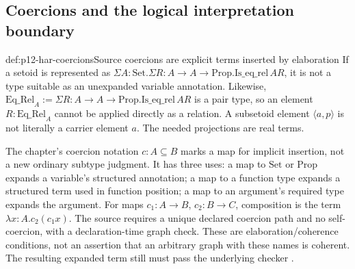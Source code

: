 

\subsection{Coercions and the logical interpretation boundary}

\begin{hbdefinition}{def:p12-har-coercions}{Source coercions are explicit terms inserted by elaboration}
If a setoid is represented as
\(\Sigma A:\mathrm{Set}.\Sigma R:A\to A\to\mathrm{Prop}.
\mathrm{Is\_eq\_rel}\,A R\), it is not a type suitable as an
unexpanded variable annotation. Likewise,
\(\mathrm{Eq\_Rel}_A:=\Sigma R:A\to A\to\mathrm{Prop}.
\mathrm{Is\_eq\_rel}\,A R\) is a pair type, so an element
\(R:\mathrm{Eq\_Rel}_A\) cannot be applied directly as a relation.
A subsetoid element \(\langle a,p\rangle\) is not literally a
carrier element \(a\). The needed projections are real terms.

The chapter's coercion notation \(c:A\subseteq B\) marks a map for
implicit insertion, not a new ordinary subtype judgment. It has three uses:
a map to \(\mathrm{Set}\) or \(\mathrm{Prop}\) expands a
variable's structured annotation; a map to a function type expands a
structured term used in function position; a map to an argument's required
type expands the argument. For maps \(c_1:A\to B\),
\(c_2:B\to C\), composition is the term
\(\lambda x:A.c_2(c_1x)\). The source requires a unique declared
coercion path and no self-coercion, with a declaration-time graph check.
These are elaboration/coherence conditions, not an assertion that an
arbitrary graph with these names is coherent. The resulting expanded term
still must pass the underlying checker
\cite[pp.~1173--1175]{BarendregtGeuvers2001}.
\end{hbdefinition}

